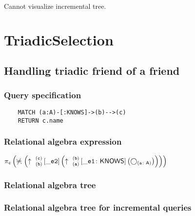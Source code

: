 	Cannot visualize incremental tree.

	\section{TriadicSelection}

	\subsection{Handling triadic friend of a friend}

	\subsubsection*{Query specification}

	\begin{lstlisting}
	MATCH (a:A)-[:KNOWS]->(b)-->(c)
	RETURN c.name
	\end{lstlisting}


	\subsubsection*{Relational algebra expression}

	$\projection{\var{c}} \left(\alldifferent{} \left(\expandout{b}{c}{}{\_e2}{} \left(\expandout{a}{b}{}{\_e1}{KNOWS} \left(\getvertices{a}{A}\right)\right)\right)\right)$

	\subsubsection*{Relational algebra tree}


	\subsubsection*{Relational algebra tree for incremental queries}

